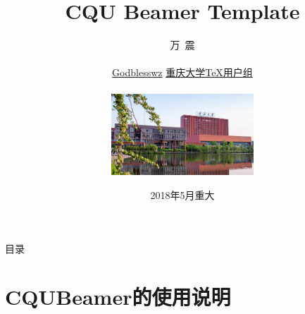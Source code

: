 \documentclass[8pt,aspectratio=169,mathserif,UTF8]{beamer}
\begin{document}
\beamertemplatenavigationsymbolsempty
 
\title{ CQU Beamer Template}	     %
\author[万震（重庆大学）]{
万\ 震\\
\vskip5pt
{\color{blue}\faEnvelopeO}\\
{\color{blue}\faGithub}\hspace{0.1cm} {\href{https://github.com/Godblesswz}{Godblesswz}}
\vskip5pt
\href{https://github.com/CQUtug}{重庆大学TeX用户组}\\
  \begin{center}
  \includegraphics[width=0.4\textwidth]{CQU_Campus_D.jpg}%
  \end{center}
  \vskip-35pt
}

\date[2018年5月]{2018年5月\quad 重大}
 
\begin{frame}[plain]
  \vskip25pt
  \titlepage
\end{frame}
\setcounter{framenumber}{0}				

\section*{}   
\begin{frame}{目录}
  \begin{multicols}{2}
    \tableofcontents[subsubsectionstyle=hide]  
  \end{multicols}
\end{frame}			

\section{CQUBeamer的使用说明}
\end{document}
